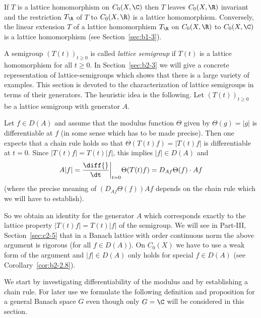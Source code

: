 \begin{remark}\label{rem:b2-2.1}
If\/ $T$ is a lattice homomorphism on $C_{0}(X,\C)$ then $T$ leaves $C_{0}(X,\R)$ invariant and the restriction $T_{\R}$ of\/ $T$ to $C_{0}(X,\R)$ is a lattice homomorphism.
Conversely, the linear extension $T$ of a lattice homomorphism $T_{\R}$ on $C_{0}(X,\R)$ to $C_{0}(X,\C)$ is a lattice homomorphism (see Section~\ref{sec:b1-3}).
\end{remark}

A semigroup $(T(t))_{t \geq 0}$ is called \emph{lattice semigroup} if\/ $T(t)$ is a lattice homomorphism for all $t \geq 0$.
In Section~\ref{sec:b2-3} we will give a concrete representation of lattice-semigroups which shows that there is a large variety of examples.
This section is devoted to the characterization of lattice semigroups in terms of their generators.
The heuristic idea is the following.
Let $(T(t))_{t \geq 0}$ be a lattice semigroup with generator $A$.

Let $f \in D(A)$ and assume that the modulus function $\Theta$ given by $\Theta(g) = |g|$ is differentiable at $f$ (in some sense which has to be made precise).
Then one expects that a chain rule holds so that $\Theta(T(t)f) = |T(t)f|$ is differentiable at $t = 0$.
Since $|T(t)f| = T(t)|f|$, this implies $|f| \in D(A)$ and 
\[
A|f| = \frac{\diff{}}{\dt}\bigg|_{t=0} \Theta(T(t)f)
     = D_{Af}\Theta(f) \cdot Af
\]
 (where the precise meaning of\/ $(D_{Af}\Theta(f))Af$  
 depends on the chain rule which we will have to establish).
 
So we obtain an identity for the generator $A$ which corresponds exactly to the lattice property $|T(t)f| = T(t)|f|$ of the semigroup.
We will see in Part-III, Section~\ref{sec:c2-5} that in a Banach lattice with order continuous norm the above argument is rigorous (for all $f \in D(A)$).
On $C_{0}(X)$ we have to use a weak form of the argument and $|f| \in D(A)$ only holds for special $f \in D(A)$ (see Corollary~\ref{cor:b2-2.8}).

We start by investigating differentiability of the modulus and by establishing a chain rule.
For later use we formulate the following definition and proposition for a general Banach space $G$ even though only $G = \C$ will be considered in this section.

